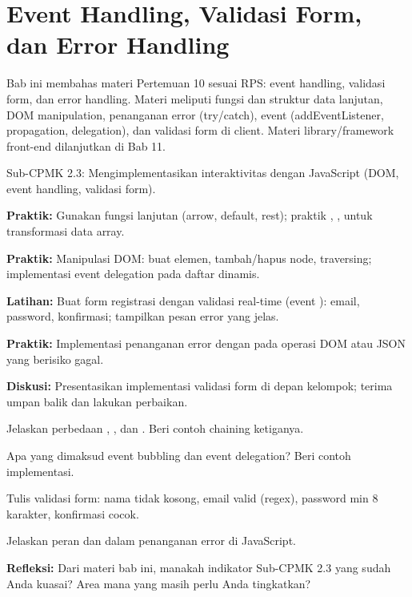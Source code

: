 \documentclass[../main.tex]{subfiles}
\begin{document}
\chapter{Event Handling, Validasi Form, dan Error Handling}

Bab ini membahas materi Pertemuan 10 sesuai RPS: event handling, validasi form, dan error handling. Materi meliputi fungsi dan struktur data lanjutan, DOM manipulation, penanganan error (try/catch), event (addEventListener, propagation, delegation), dan validasi form di client. Materi library/framework front-end dilanjutkan di Bab 11.

\begin{subcpmk}
  \item Sub-CPMK 2.3: Mengimplementasikan interaktivitas dengan JavaScript (DOM, event handling, validasi form).
\end{subcpmk}














\begin{aktivitas}
  \item \textbf{Praktik:} Gunakan fungsi lanjutan (arrow, default, rest); praktik , ,  untuk transformasi data array.
  \item \textbf{Praktik:} Manipulasi DOM: buat elemen, tambah/hapus node, traversing; implementasi event delegation pada daftar dinamis.
  \item \textbf{Latihan:} Buat form registrasi dengan validasi real-time (event ): email, password, konfirmasi; tampilkan pesan error yang jelas.
  \item \textbf{Praktik:} Implementasi penanganan error dengan  pada operasi DOM atau JSON yang berisiko gagal.
  \item \textbf{Diskusi:} Presentasikan implementasi validasi form di depan kelompok; terima umpan balik dan lakukan perbaikan.
\end{aktivitas}

\begin{latihan}
  \item Jelaskan perbedaan , , dan . Beri contoh chaining ketiganya.
  \item Apa yang dimaksud event bubbling dan event delegation? Beri contoh implementasi.
  \item Tulis validasi form: nama tidak kosong, email valid (regex), password min 8 karakter, konfirmasi cocok.
  \item Jelaskan peran  dan  dalam penanganan error di JavaScript.
  \item \textbf{Refleksi:} Dari materi bab ini, manakah indikator Sub-CPMK 2.3 yang sudah Anda kuasai? Area mana yang masih perlu Anda tingkatkan?
\end{latihan}
\end{document}
